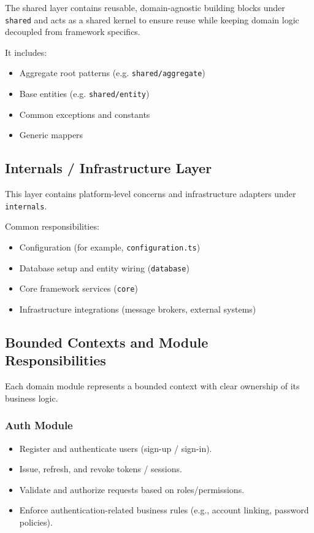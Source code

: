 The shared layer contains reusable, domain-agnostic building blocks under \texttt{shared} and acts as a shared kernel to ensure reuse while keeping domain logic decoupled from framework specifics.

It includes:

\begin{itemize}
	\item Aggregate root patterns (e.g. \texttt{shared/aggregate})
	\item Base entities (e.g. \texttt{shared/entity})
	\item Common exceptions and constants
	\item Generic mappers
\end{itemize}

\subsection{Internals / Infrastructure Layer}

This layer contains platform-level concerns and infrastructure adapters under \texttt{internals}.

Common responsibilities:

\begin{itemize}
	\item Configuration (for example, \texttt{configuration.ts})
	\item Database setup and entity wiring (\texttt{database})
	\item Core framework services (\texttt{core})
	\item Infrastructure integrations (message brokers, external systems)
\end{itemize}

\subsection{Bounded Contexts and Module Responsibilities}

Each domain module represents a bounded context with clear ownership of its business logic.

\subsubsection{Auth Module}
\begin{itemize}
    \item Register and authenticate users (sign-up / sign-in).
    \item Issue, refresh, and revoke tokens / sessions.
    \item Validate and authorize requests based on roles/permissions.
    \item Enforce authentication-related business rules (e.g., account linking, password policies).
\end{itemize}


